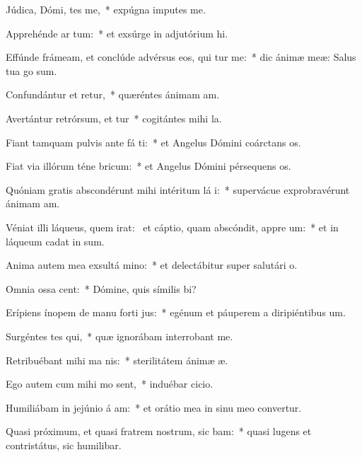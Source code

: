 \item Júdica, Dómi, tes me,~* expúgna imputes me.
\item Apprehénde ar  tum:~* et exsúrge in adjutórium hi.
\item Effúnde frámeam, et conclúde advérsus eos, qui tur me:~* dic ánimæ meæ: Salus tua go sum.
\item Confundántur et retur,~* quæréntes ánimam am.
\item Avertántur retrórsum, et tur~* cogitántes mihi la.
\item Fiant tamquam pulvis ante fá ti:~* et Angelus Dómini coárctans os.
\item Fiat via illórum téne  bricum:~* et Angelus Dómini pérsequens os.
\item Quóniam gratis abscondérunt mihi intéritum lá i:~* supervácue exprobravérunt ánimam am.
\item Véniat illi láqueus, quem irat:~\pscross{} et cáptio, quam abscóndit, appre um:~* et in láqueum cadat in sum.
\item Anima autem mea exsultá  mino:~* et delectábitur super salutári o.
\item Omnia ossa  cent:~* Dómine, quis símilis bi?
\item Erípiens ínopem de manu forti jus:~* egénum et páuperem a diripiéntibus um.
\item Surgéntes tes qui,~* quæ ignorábam interrobant me.
\item Retribuébant mihi ma  nis:~* sterilitátem ánimæ æ.
\item Ego autem cum mihi mo sent,~* induébar cicio.
\item Humiliábam in jejúnio á am:~* et orátio mea in sinu meo convertur.
\item Quasi próximum, et quasi fratrem nostrum, sic bam:~* quasi lugens et contristátus, sic humilibar.

